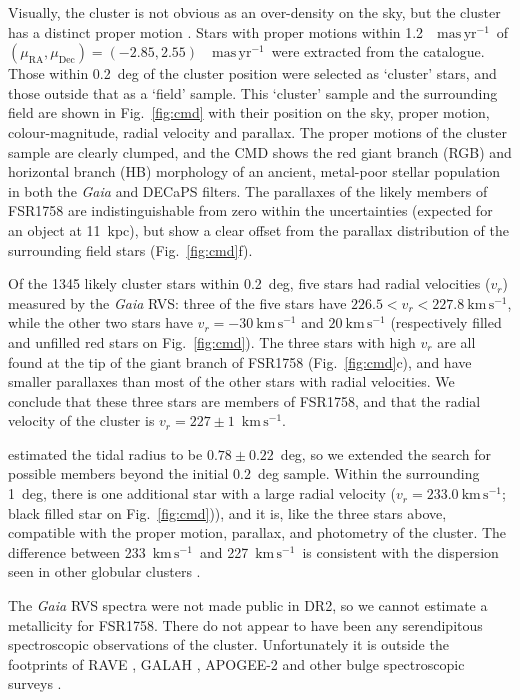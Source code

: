 \documentclass[fleqn,usenatbib]{mnras}
\newcommand{\kms}{~\ensuremath{\textrm{km}\,\textrm{s}^{-1}}}
\newcommand{\masyr}{~\ensuremath{\textrm{mas}\,\textrm{yr}^{-1}}}
\begin{document}
Visually, the cluster is not obvious as an over-density on the sky, but the cluster has a distinct proper motion \citep{Cantat-Gaudin2018, Barba2018}. Stars with proper motions within 1.2~\masyr\ of $(\mu_\mathrm{RA},\mu_\mathrm{Dec})=(-2.85,2.55)$~\masyr\ were extracted from the catalogue. Those within 0.2~deg of the cluster position were selected as `cluster' stars, and those outside that as a `field' sample. This `cluster' sample and the surrounding field are shown in Fig.\ \ref{fig:cmd} with their position on the sky, proper motion, colour-magnitude, radial velocity and parallax. The proper motions of the cluster sample are clearly clumped, and the CMD shows the red giant branch (RGB) and horizontal branch (HB) morphology of an ancient, metal-poor stellar population in both the \textit{Gaia} and DECaPS filters. The parallaxes of the likely members of FSR1758 are indistinguishable from zero within the uncertainties (expected for an object at 11~kpc), but show a clear offset from the parallax distribution of the surrounding field stars (Fig.\ \ref{fig:cmd}f).

Of the 1345 likely cluster stars within 0.2~deg, five stars had radial velocities ($v_r$) measured by the \textit{Gaia} RVS: three of the five stars have $226.5<v_r<227.8\kms$, while the other two stars have $v_r=-30\kms$ and $20\kms$ (respectively filled and unfilled red stars on Fig.\ \ref{fig:cmd}). The three stars with high $v_r$ are all found at the tip of the giant branch of FSR1758 (Fig.\ \ref{fig:cmd}c), and have smaller parallaxes than most of the other stars with radial velocities. We conclude that these three stars are members of FSR1758, and that the radial velocity of the cluster is $v_r=227\pm1$\kms.

 estimated the tidal radius to be $0.78\pm0.22$~deg, so we extended the search for possible members beyond the initial $0.2$~deg sample. Within the surrounding 1~deg, there is one additional star with a large radial velocity ($v_r=233.0\kms$; black filled star on Fig.\ \ref{fig:cmd})), and it is, like the three stars above, compatible with the proper motion, parallax, and photometry of the cluster. The difference between 233\kms\ and 227\kms\ is consistent with the dispersion seen in other globular clusters \cite[e.g., $\omega$~Cen has a velocity dispersion of $\sim10\kms$;][]{Johnson:2010fs}.

The \textit{Gaia} RVS spectra were not made public in DR2, so we cannot estimate a metallicity for FSR1758. There do not appear to have been any serendipitous spectroscopic observations of the cluster. Unfortunately it is outside the footprints of RAVE \citep{Kunder:2017gp}, GALAH \citep{DeSilva:2015gr,Buder2018}, APOGEE-2 \citep{Zasowski:2017jy} and other bulge spectroscopic surveys \citep[e.g.,][]{Freeman2013,Zoccali2014,Howes:2016ji}.
\end{document}
